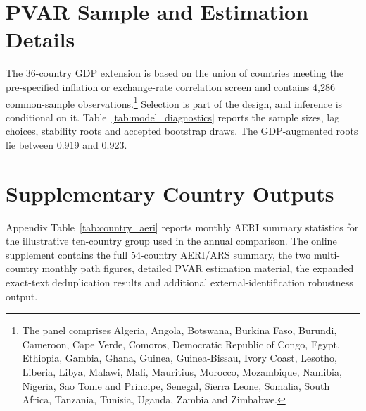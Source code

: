 \documentclass[12pt]{article}
\begin{document}
\section{PVAR Sample and Estimation Details}\label{app:pvar}


The 36-country GDP extension is based on the union of countries meeting the pre-specified inflation or exchange-rate correlation screen and contains 4,286 common-sample observations.\footnote{The panel comprises Algeria, Angola, Botswana, Burkina Faso, Burundi, Cameroon, Cape Verde, Comoros, Democratic Republic of Congo, Egypt, Ethiopia, Gambia, Ghana, Guinea, Guinea-Bissau, Ivory Coast, Lesotho, Liberia, Libya, Malawi, Mali, Mauritius, Morocco, Mozambique, Namibia, Nigeria, Sao Tome and Principe, Senegal, Sierra Leone, Somalia, South Africa, Tanzania, Tunisia, Uganda, Zambia and Zimbabwe.} Selection is part of the design, and inference is conditional on it. Table~\ref{tab:model_diagnostics} reports the sample sizes, lag choices, stability roots and accepted bootstrap draws. The GDP-augmented roots lie between 0.919 and 0.923.


\section{Supplementary Country Outputs}\label{app:supp_country}
Appendix Table~\ref{tab:country_aeri} reports monthly AERI summary statistics for the illustrative ten-country group used in the annual comparison. The online supplement contains the full 54-country AERI/ARS summary, the two multi-country monthly path figures, detailed PVAR estimation material, the expanded exact-text deduplication results and additional external-identification robustness output.

\end{document}
